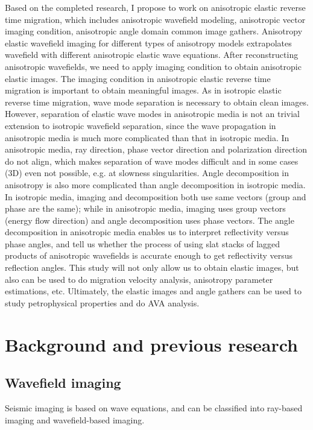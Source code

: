 Based on the completed research, I propose to work on anisotropic elastic reverse time migration, which includes anisotropic wavefield modeling, anisotropic vector imaging condition, anisotropic angle domain common image gathers. 
Anisotropy elastic wavefield imaging for different types of anisotropy models extrapolates wavefield with different anisotropic elastic wave equations. After reconstructing anisotropic wavefields, we need to apply imaging condition to obtain anisotropic elastic images. The imaging condition in anisotropic elastic reverse time migration is important to obtain meaningful images. As in isotropic elastic reverse time migration, wave mode separation is necessary to obtain clean images. 
However, separation of elastic wave modes in anisotropic media is not an trivial extension to isotropic wavefield separation, since the wave propagation in anisotropic media is much more complicated than that in isotropic media. In anisotropic media, ray direction, phase vector direction and polarization direction do not align, which makes separation of wave modes difficult and in some cases (3D) even not possible, e.g. at slowness singularities.
Angle decomposition in anisotropy is also more complicated than angle decomposition in isotropic media. 
In isotropic media, imaging and decomposition both use same vectors (group and phase are the same); while in anisotropic media, imaging uses group vectors (energy flow direction) and angle decomposition uses phase vectors.
The angle decomposition in anisotropic media enables us to interpret reflectivity versus phase angles, and tell us whether the process of using slat stacks of lagged products of anisotropic wavefields is accurate enough to get reflectivity versus reflection angles.
This study will not only allow us to obtain elastic images, but also can be used to do migration velocity analysis, anisotropy parameter estimations, etc. Ultimately, the elastic images and angle gathers can be used to study petrophysical properties and do AVA analysis.







\section{Background and previous research}

\subsection{Wavefield imaging}
Seismic imaging is based on wave equations, and can be classified into ray-based imaging and wavefield-based imaging. 

